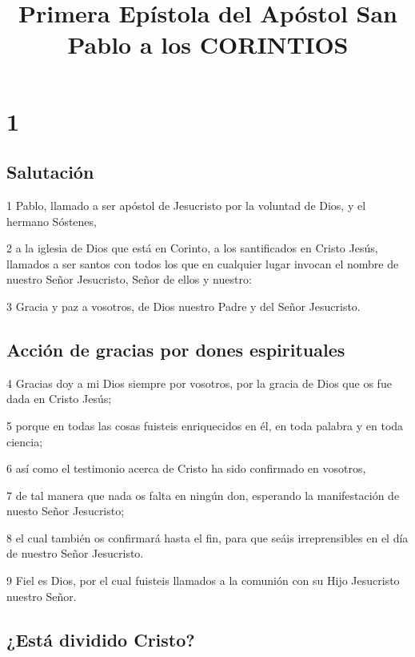 
\title{Primera Epístola del Apóstol San Pablo a los CORINTIOS}

\chapter{1}

\section*{Salutación}

\par 1 Pablo, llamado a ser apóstol de Jesucristo por la voluntad de Dios, y el hermano Sóstenes,
\par 2 a la iglesia de Dios que está en Corinto, a los santificados en Cristo Jesús, llamados a ser santos con todos los que en cualquier lugar invocan el nombre de nuestro Señor Jesucristo, Señor de ellos y nuestro:
\par 3 Gracia y paz a vosotros, de Dios nuestro Padre y del Señor Jesucristo.

\section*{Acción de gracias por dones espirituales}

\par 4 Gracias doy a mi Dios siempre por vosotros, por la gracia de Dios que os fue dada en Cristo Jesús;
\par 5 porque en todas las cosas fuisteis enriquecidos en él, en toda palabra y en toda ciencia;
\par 6 así como el testimonio acerca de Cristo ha sido confirmado en vosotros,
\par 7 de tal manera que nada os falta en ningún don, esperando la manifestación de nuesto Señor Jesucristo;
\par 8 el cual también os confirmará hasta el fin, para que seáis irreprensibles en el día de nuestro Señor Jesucristo.
\par 9 Fiel es Dios, por el cual fuisteis llamados a la comunión con su Hijo Jesucristo nuestro Señor.

\section*{¿Está dividido Cristo?}

